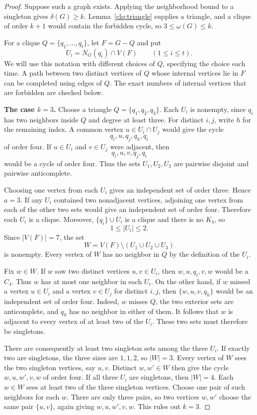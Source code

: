 \begin{proof}
Suppose such a graph exists. Applying the neighborhood bound to a
singleton gives $\delta(G)\ge k$. Lemma~\ref{clq:triangle} supplies
a triangle, and a clique of order $k+1$ would contain the forbidden
cycle, so $3\le\omega(G)\le k$.

For a clique $Q=\{q_1,\ldots,q_t\}$, let $F=G-Q$ and put
\[
  U_i=N_G(q_i)\cap V(F)\qquad(1\le i\le t).
\]
We will use this notation with different choices of $Q$, specifying
the choice each time. A path between two distinct vertices of $Q$
whose internal vertices lie in $F$ can be completed using edges of
$Q$. The exact numbers of internal vertices that are forbidden are
checked below.

\medskip
\noindent\textbf{The case $k=3$.}
Choose a triangle $Q=\{q_1,q_2,q_3\}$. Each $U_i$ is nonempty,
since $q_i$ has two neighbors inside $Q$ and degree at least three.
For distinct $i,j$, write $h$ for the remaining index. A common
vertex $u\in U_i\cap U_j$ would give the cycle
\[
  q_i,u,q_j,q_h,q_i
\]
of order four. If $u\in U_i$ and $v\in U_j$ were adjacent, then
\[
  q_i,u,v,q_j,q_i
\]
would be a cycle of order four. Thus the sets $U_1,U_2,U_3$ are
pairwise disjoint and pairwise anticomplete.

Choosing one vertex from each $U_i$ gives an independent set of
order three. Hence $a=3$. If any $U_i$ contained two nonadjacent
vertices, adjoining one vertex from each of the other two sets would
give an independent set of order four. Therefore each $U_i$ is a
clique. Moreover, $\{q_i\}\cup U_i$ is a clique and there is no
$K_4$, so
\[
  1\le |U_i|\le2.
\]
Since $|V(F)|=7$, the set
\[
  W=V(F)\setminus(U_1\cup U_2\cup U_3)
\]
is nonempty. Every vertex of $W$ has no neighbor in $Q$ by the
definition of the $U_i$.

Fix $w\in W$. If $w$ saw two distinct vertices $u,v\in U_i$, then
$w,u,q_i,v,w$ would be a $C_4$. Thus $w$ has at most one neighbor
in each $U_i$. On the other hand, if $w$ missed a vertex $u\in U_i$
and a vertex $v\in U_j$ for distinct $i,j$, then
$\{w,u,v,q_h\}$ would be an independent set of order four. Indeed,
$w$ misses $Q$, the two exterior sets are anticomplete, and $q_h$
has no neighbor in either of them. It follows that $w$ is adjacent
to every vertex of at least two of the $U_i$. These two sets must
therefore be singletons.

There are consequently at least two singleton sets among the three
$U_i$. If exactly two are singletons, the three sizes are $1,1,2$,
so $|W|=3$. Every vertex of $W$ sees the two singleton vertices,
say $u,v$. Distinct $w,w'\in W$ then give the cycle
$w,u,w',v,w$ of order four. If all three $U_i$ are singletons,
then $|W|=4$. Each $w\in W$ sees at least two of the three singleton
vertices. Choose one pair of such neighbors for each $w$. There are
only three pairs, so two vertices $w,w'$ choose the same pair
$\{u,v\}$, again giving $w,u,w',v,w$. This rules out $k=3$.


\end{proof}
